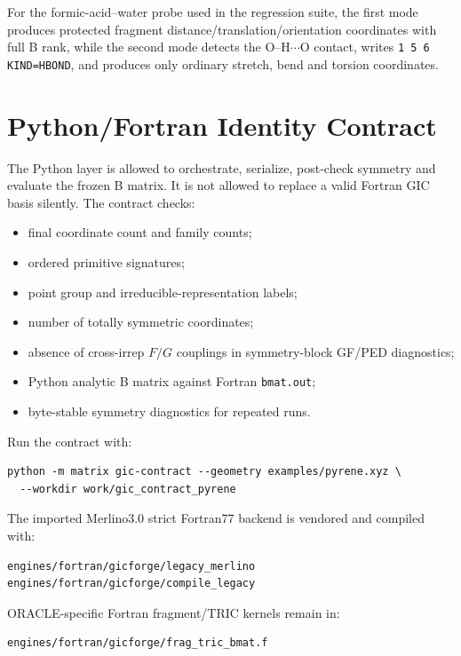 \documentclass[11pt]{article}
\begin{document}
\noindent
For the formic-acid--water probe used in the regression suite, the first mode
produces protected fragment distance/translation/orientation coordinates with
full B rank, while the second mode detects the O--H\(\cdots\)O contact, writes
\texttt{1 5 6 KIND=HBOND}, and produces only ordinary stretch, bend and torsion
coordinates.

\section{Python/Fortran Identity Contract}

The Python layer is allowed to orchestrate, serialize, post-check symmetry and
evaluate the frozen B matrix.  It is not allowed to replace a valid Fortran GIC
basis silently.  The contract checks:

\begin{itemize}
  \item final coordinate count and family counts;
  \item ordered primitive signatures;
  \item point group and irreducible-representation labels;
  \item number of totally symmetric coordinates;
  \item absence of cross-irrep \(F/G\) couplings in symmetry-block GF/PED
  diagnostics;
  \item Python analytic B matrix against Fortran \texttt{bmat.out};
  \item byte-stable symmetry diagnostics for repeated runs.
\end{itemize}

\noindent
Run the contract with:

\begin{lstlisting}[style=oracle]
python -m matrix gic-contract --geometry examples/pyrene.xyz \
  --workdir work/gic_contract_pyrene
\end{lstlisting}

\noindent
The imported Merlino3.0 strict Fortran77 backend is vendored and compiled with:

\begin{lstlisting}[style=oracle]
engines/fortran/gicforge/legacy_merlino
engines/fortran/gicforge/compile_legacy
\end{lstlisting}

\noindent
ORACLE-specific Fortran fragment/TRIC kernels remain in:

\begin{lstlisting}[style=oracle]
engines/fortran/gicforge/frag_tric_bmat.f
\end{lstlisting}
\end{document}
